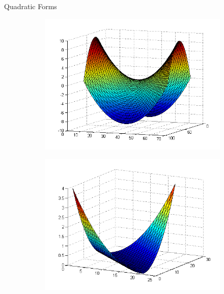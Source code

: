 \documentclass[11pt, xcolor={dvipsnames}, hyperref={colorlinks, allcolors=Blue}]{beamer}
\begin{document}
\begin{frame}{Quadratic Forms}
\begin{figure}
	\begin{subfigure}[b]{0.45\textwidth}
		\centering
		\includegraphics[width=\textwidth]{quadraticform3}
	\end{subfigure}
	\begin{subfigure}[b]{0.45\textwidth}
		\centering
		\includegraphics[width=\textwidth]{quadraticform4}
	\end{subfigure}

\end{figure}
\end{frame}
\end{document}
